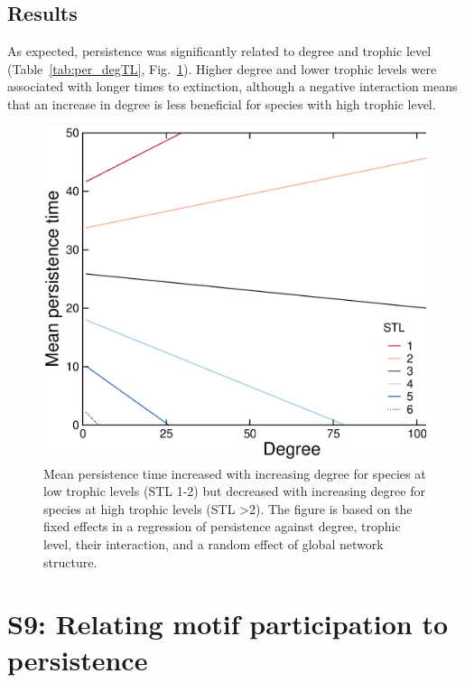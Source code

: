 \documentclass[12pt]{article}
\begin{document}
\begin{spacing}{2.0}
	\subsection*{Results}

		As expected, persistence was significantly related to degree and trophic level (Table~\ref{tab:per_degTL}, Fig.~\ref{fig:persistence_degTL}).
		Higher degree and lower trophic levels were associated with longer times to extinction, although a negative interaction means that an increase in degree is less beneficial for species with high trophic level.


	    \begin{figure}[hb!]
	        \centering
	        \includegraphics[width=.75\textwidth]{figures/roles/persistence_vs_degTL.eps}
	        \caption{Mean persistence time increased with increasing degree for species at low trophic levels (STL 1-2) but decreased with increasing degree for species at high trophic levels (STL \textgreater2). The figure is based on the fixed effects in a regression of persistence against degree, trophic level, their interaction, and a random effect of global network structure.}
	        \label{fig:persistence_degTL}
	    \end{figure}


\clearpage


\section*{S9: Relating motif participation to persistence}



\end{spacing}
\end{document}
